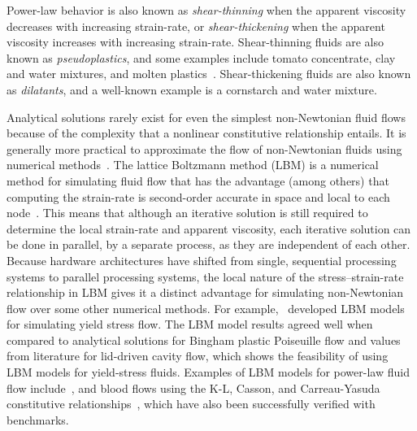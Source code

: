 Power-law behavior is also known as \emph{shear-thinning} when the apparent viscosity decreases with increasing strain-rate, or \emph{shear-thickening} when the apparent viscosity increases with increasing strain-rate.
Shear-thinning fluids are also known as \emph{pseudoplastics}, and some examples include tomato concentrate, clay and water mixtures, and molten plastics~\cite{irgens2014rheology}.
Shear-thickening fluids are also known as \emph{dilatants}, and a well-known example is a cornstarch and water mixture.

\label{sec:lbm-for-nnf}

Analytical solutions rarely exist for even the simplest non-Newtonian fluid flows because of the complexity that a nonlinear constitutive relationship entails.
It is generally more practical to approximate the flow of non-Newtonian fluids using numerical methods~\cite{syrakos2014performance,owens2002computational,chai2011multiple}.
The lattice Boltzmann method (LBM) is a numerical method for simulating fluid flow that has the advantage (among others) that computing the strain-rate is second-order accurate in space and local to each node~\cite{kruger2010second}.
This means that although an iterative solution is still required to determine the local strain-rate and apparent viscosity, each iterative solution can be done in parallel, by a separate process, as they are independent of each other.
Because hardware architectures have shifted from single, sequential processing systems to parallel processing systems, the local nature of the stress--strain-rate relationship in LBM gives it a distinct advantage for simulating non-Newtonian flow over some other numerical methods.
For example,~\cite{tang2011bingham,chai2011multiple,fallah2012multiple,chen2014simulations,vikhansky2008lattice,wang2008lattice} developed LBM models for simulating yield stress flow.
The LBM model results agreed well when compared to analytical solutions for Bingham plastic Poiseuille flow and values from literature for lid-driven cavity flow, which shows the feasibility of using LBM models for yield-stress fluids.
Examples of LBM models for power-law fluid flow include~\cite{wang2011lattice,wang2015localized,boyd2006second,chai2011multiple}, and blood flows using the K-L, Casson, and Carreau-Yasuda constitutive relationships~\cite{ashrafizaadeh2009comparison}, which have also been successfully verified with benchmarks.

